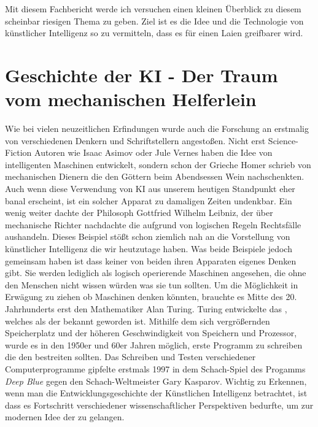 \documentclass[a4paper,12pt,german,ngerman]{report}
\begin{document}
    Mit diesem Fachbericht werde ich versuchen einen kleinen Überblick zu diesem scheinbar riesigen Thema zu geben.
    Ziel ist es die Idee und die Technologie von künstlicher Intelligenz so zu vermitteln, dass es für einen Laien greifbarer wird.


    \chapter{Geschichte der KI - Der Traum vom mechanischen Helferlein}
    Wie bei vielen neuzeitlichen Erfindungen wurde auch die Forschung an 
    erstmalig von verschiedenen Denkern und Schriftstellern angestoßen.
    Nicht erst Science-Fiction Autoren wie Isaac Asimov oder Jule Vernes haben die Idee von intelligenten Maschinen
    entwickelt, sondern schon der Grieche Homer schrieb von mechanischen Dienern die den Göttern beim Abendsessen
    Wein nachschenkten.\cite[53]{buchanan2005very} Auch wenn diese Verwendung von KI aus unserem heutigen Standpunkt
    eher banal erscheint, ist ein solcher Apparat zu damaligen Zeiten undenkbar.
    Ein wenig weiter dachte der Philosoph Gottfried Wilhelm Leibniz, der über mechanische Richter nachdachte
    die aufgrund von logischen Regeln Rechtsfälle aushandeln.\cite[53]{buchanan2005very}
    Dieses Beispiel stößt schon ziemlich nah an die Vorstellung von künstlicher Intelligenz die wir heutzutage haben.
    Was beide Beispiele jedoch gemeinsam haben ist dass keiner von beiden ihren Apparaten eigenes Denken
    gibt. Sie werden lediglich als logisch operierende Maschinen angesehen, die ohne den Menschen nicht wissen würden
    was sie tun sollten.
    Um die Möglichkeit in Erwägung zu ziehen ob Maschinen denken könnten,
    brauchte es Mitte des 20. Jahrhunderts erst den Mathematiker Alan Turing.\cite{sesink1993menschliche}
    Turing entwickelte das , welches als der  bekannt geworden ist.
    Mithilfe dem sich vergrößernden Speicherplatz und der höheren Geschwindigkeit von Speichern und Prozessor,
    wurde es in den 1950er und 60er Jahren möglich, erste Programm zu schreiben die den  bestreiten sollten.
    Das Schreiben und Testen verschiedener Computerprogramme gipfelte erstmals 1997 in dem Schach-Spiel des Progamms \emph{Deep Blue}
    gegen den Schach-Weltmeister Gary Kasparov.\cite{hsu1999ibm}
    Wichtig zu Erkennen, wenn man die Entwicklungsgeschichte der Künstlichen Intelligenz betrachtet, ist dass es Fortschritt verschiedener
    wissenschaftlicher Perspektiven\cite{buchanan2005very} bedurfte, um zur modernen Idee der  zu gelangen.
\end{document}
